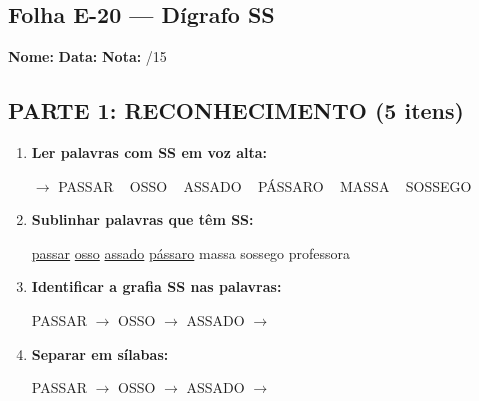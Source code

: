 \subsection{Folha E-20 --- Dígrafo SS}
\begin{exercicio}



\noindent\textbf{Nome:} \underline{\hspace{3.2cm}} \quad \textbf{Data:} \underline{\hspace{1.6cm}} \quad \textbf{Nota:} \underline{\hspace{0.9cm}}/15


\subsection*{PARTE 1: RECONHECIMENTO (5 itens)}

\begin{enumerate}

  \item \textbf{Ler palavras com SS em voz alta:}
  \begin{center}
  $\rightarrow$ PASSAR ~ OSSO ~ ASSADO ~ PÁSSARO ~ MASSA ~ SOSSEGO
  \end{center}

  \item \textbf{Sublinhar palavras que têm SS:}

\begin{center}
  \uline{passar} \quad \uline{osso} \quad \uline{assado} \quad \uline{pássaro} \quad massa \quad sossego \quad professora
\end{center}

  \item \textbf{Identificar a grafia SS nas palavras:}
  \begin{center}
  PASSAR $\rightarrow$ \underline{\hspace{1cm}} \quad OSSO $\rightarrow$ \underline{\hspace{1cm}} \quad ASSADO $\rightarrow$ \underline{\hspace{1cm}}
  \end{center}

  \item \textbf{Separar em sílabas:}
  \begin{center}
  PASSAR $\rightarrow$ \underline{\hspace{1.2cm}} \quad OSSO $\rightarrow$ \underline{\hspace{1.2cm}} \quad ASSADO $\rightarrow$ \underline{\hspace{1.2cm}}
  \end{center}


\end{enumerate}
\end{exercicio}
